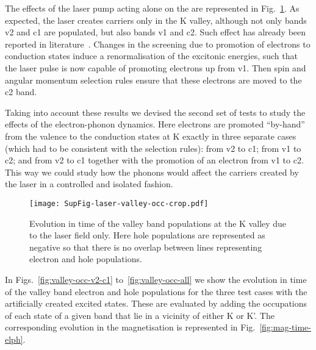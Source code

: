 \documentclass[prb,aps,superscriptaddress,reprint,floatfix]{revtex4-1}
\begin{document}
The effects of the laser pump acting alone on the \mose are represented in Fig.~\ref{fig:laser-20K}. As expected, the laser creates carriers only in the K valley, although not only bands v2 and c1 are populated, but also bands v1 and c2. Such effect has already been reported in literature~\cite{NanoLetters.17.4549}. Changes in the screening due to promotion of electrons to conduction states induce a renormalisation of the excitonic energies, such that the laser pulse is now capable of promoting electrons up from v1. Then spin and angular momentum selection rules ensure that these electrons are moved to the c2 band.

Taking into account these results we devised the second set of tests to study the effects of the electron-phonon dynamics. Here electrons are promoted ``by-hand'' from the valence to the conduction states at K exactly in three separate cases (which had to be consistent with the selection rules): from v2 to c1; from v1 to c2; and from v2 to c1 together with the promotion of an electron from v1 to c2. This way we could study how the phonons would affect the carriers created by the laser in a controlled and isolated fashion. 

\begin{figure}[ht]
	\texttt{[image: SupFig-laser-valley-occ-crop.pdf]}
\caption{Evolution in time of the valley band populations at the K valley due to the laser field only. Here hole populations are represented as negative so that there is no overlap between lines representing electron and hole populations.}
\label{fig:laser-20K}
\end{figure}

In Figs.~\ref{fig:valley-occ-v2-c1}  to~\ref{fig:valley-occ-all} we show the evolution in time of the valley band electron and hole populations for the three test cases with the artificially created excited states. These are evaluated by adding the occupations of each state of a given band that lie in a vicinity of either K or K'. The corresponding evolution in the magnetisation is represented in Fig.~\ref{fig:mag-time-elph}.
\end{document}
